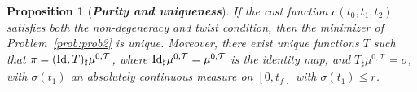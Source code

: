 \documentclass[11pt]{article}
\newcommand{\calT}{{\mathcal T}}
\newcommand{\black}{\color{black}}
\newtheorem{proposition}{Proposition}
\begin{document}


\begin{proposition}[\bf \textit{Purity and uniqueness}]\label{prop:pureness}
If the cost function $c(t_0, t_1, t_2)$ satisfies both the non-degeneracy and twist condition, then the minimizer of Problem~\ref{prob:prob2} is unique. Moreover, there exist unique functions $T$ such that
$\pi = ({\rm Id}, T)_{\sharp}\mu^{0,\calT}$,
where ${\rm Id}_{\sharp}\mu^{0,\calT} = \mu^{0,\calT}$ is the identity map, and $T_{\sharp}\mu^{0,\calT} = \sigma$, with $\sigma(t_1)$ an absolutely continuous measure on $[0,t_f]$ with $\sigma(t_1)\leq  r$. 
\end{proposition}
\end{document}

